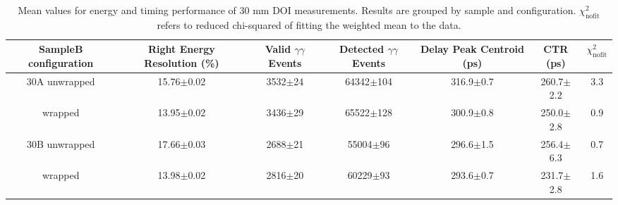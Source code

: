 \begin{table}
\caption{\label{tab:doictrresults} Mean values for energy and timing performance of 30 mm DOI measurements. Results are grouped by sample and configuration. $\chi^2_\text{nofit}$ refers to reduced chi-squared of fitting the weighted mean to the data.}
\begin{tabular}{ccccccc}
\hline
SampleB configuration & Right Energy Resolution (\%) & Valid $\gamma\gamma$ Events & Detected $\gamma\gamma$ Events & Delay Peak Centroid (ps)  & CTR (ps) &  $\chi^2_\text{nofit}$ \\
\hline
30A     unwrapped     &  15.76$\pm$0.02 &  3532$\pm$24 &  64342$\pm$104 &  316.9$\pm$0.7 &  260.7$\pm$2.2 &    3.3 \\
        wrapped       &  13.95$\pm$0.02 &  3436$\pm$29 &  65522$\pm$128 &  300.9$\pm$0.8 &  250.0$\pm$2.8 &    0.9 \\
30B     unwrapped     &  17.66$\pm$0.03 &  2688$\pm$21 &   55004$\pm$96 &  296.6$\pm$1.5 &  256.4$\pm$6.3 &    0.7 \\
        wrapped       &  13.98$\pm$0.02 &  2816$\pm$20 &   60229$\pm$93 &  293.6$\pm$0.7 &  231.7$\pm$2.8 &    1.6 \\
\hline
\end{tabular}
\end{table}

